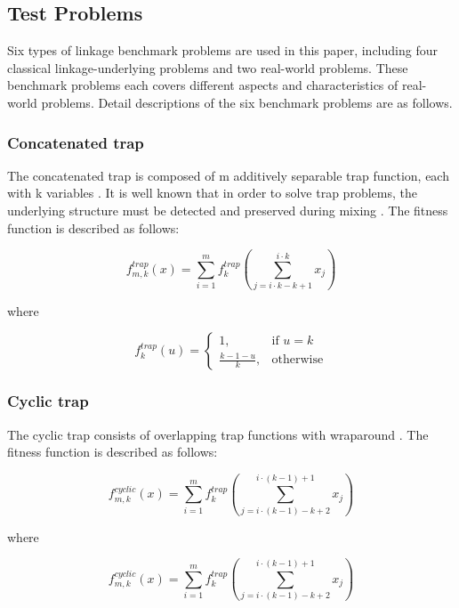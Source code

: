 \documentclass{sig-alternate-05-2015}
\begin{document}
\subsection{Test Problems}
Six types of linkage benchmark problems are used in this paper, including four classical linkage-underlying problems and two real-world problems. These benchmark problems each covers different aspects and characteristics of real-world problems. Detail descriptions of the six benchmark problems are as follows.


\subsubsection{Concatenated trap}
The concatenated trap is composed of m additively separable trap function, each with k variables \cite{goldberg:deception}. It is well known that in order to solve trap problems, the underlying structure must be detected and preserved during mixing \cite{pelikan:overlap}. The fitness function is described as follows:

\begin{displaymath}
f_{m,k}^{trap}(x) = \sum_{i=1}^{m} f_{k}^{trap} \left (\sum_{j = i\cdot k-k+1}^{i\cdot k} x_j\right )
\end{displaymath}

where

\begin{displaymath}
f_{k}^{trap}(u) = 
   \begin{cases}
    1, & \text{if $u=k$} \\
    \frac{k-1-u}{k}, & \text{otherwise}
	\end{cases}
\end{displaymath}


\subsubsection{Cyclic trap}
The cyclic trap consists of overlapping trap functions with wraparound \cite{yu:overlapping}. The fitness function is described as follows:

\begin{displaymath}
f_{m,k}^{cyclic}(x) = \sum_{i=1}^{m} f_{k}^{trap} \left (\sum_{j = i\cdot(k-1)-k+2}^{i\cdot(k-1)+1} x_j\right )
\end{displaymath}

where

\begin{displaymath}
f_{m,k}^{cyclic}(x) = \sum_{i=1}^{m} f_{k}^{trap} \left (\sum_{j = i\cdot(k-1)-k+2}^{i\cdot(k-1)+1} x_j\right )
\end{displaymath}
\end{document}
